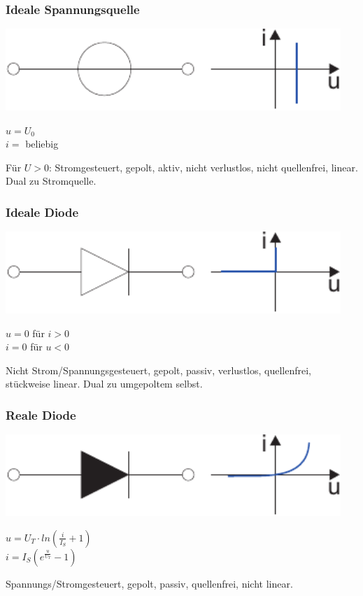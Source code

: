 \documentclass[a4paper,twocolumn,10pt]{article}
\begin{document}
\subsubsection*{Ideale Spannungsquelle}
\begin{minipage}[b]{0.26\textwidth}
\includegraphics[width=0.95\textwidth]{img/Spannungsquelle}
\end{minipage}
\hfill
\begin{minipage}[b]{0.2\textwidth}
$u=U_0$\\
$i=$ beliebig
\end{minipage}
Für $U>0$: Stromgesteuert, gepolt, aktiv, nicht verlustlos, nicht quellenfrei, linear. Dual zu Stromquelle.

\subsubsection*{Ideale Diode}
\begin{minipage}[b]{0.26\textwidth}
\includegraphics[width=0.95\textwidth]{img/IdealeDiode}
\end{minipage}
\hfill
\begin{minipage}[b]{0.2\textwidth}
$u=0$ für $i>0$\\
$i=0$ für $u<0$
\end{minipage}
Nicht Strom/Spannungsgesteuert, gepolt, passiv, verlustlos, quellenfrei, stückweise linear. Dual zu umgepoltem selbst.

\subsubsection*{Reale Diode}
\begin{minipage}[b]{0.26\textwidth}
\includegraphics[width=0.95\textwidth]{img/RealeDiode}
\end{minipage}
\hfill
\begin{minipage}[b]{0.2\textwidth}
$u=U_T\cdot ln(\frac{i}{I_S}+1)$\\
$i=I_S(e^{\frac{u}{U_T}}-1)$
\end{minipage}
Spannungs/Stromgesteuert, gepolt, passiv, quellenfrei, nicht linear.
\end{document}
